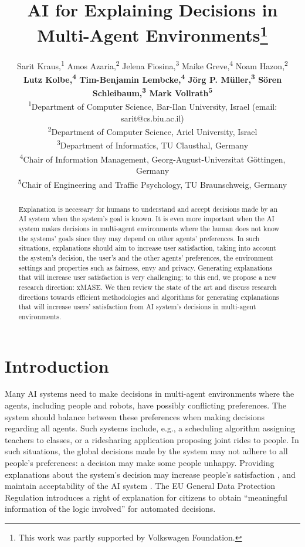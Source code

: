 \documentclass[letterpaper]{article} %
\title{AI for Explaining Decisions in Multi-Agent Environments\thanks{This work was partly supported by Volkswagen Foundation.}}
\author{Sarit Kraus,\textsuperscript{\rm 1} Amos Azaria,\textsuperscript{\rm 2} Jelena Fiosina,\textsuperscript{\rm 3} Maike Greve,\textsuperscript{\rm 4} Noam Hazon,\textsuperscript{\rm 2}\\
\Large{\textbf{Lutz Kolbe,\textsuperscript{\rm 4} Tim-Benjamin Lembcke,\textsuperscript{\rm 4} Jörg P. Müller,\textsuperscript{\rm 3} Sören Schleibaum,\textsuperscript{\rm 3} Mark Vollrath\textsuperscript{\rm 5}}} \\
\textsuperscript{1}{Department of Computer Science, Bar-Ilan University, Israel} (email: sarit@cs.biu.ac.il)\\
\textsuperscript{2}{Department of Computer Science, Ariel University, Israel} \\
\textsuperscript{3}{Department of Informatics, TU Clausthal, Germany} \\
\textsuperscript{4}{Chair of Information Management, Georg-August-Universitat Göttingen, Germany} \\
\textsuperscript{5}{Chair of Engineering and Traffic Psychology, TU Braunschweig, Germany}
}
\begin{document}
\maketitle

\begin{abstract}
Explanation is necessary for humans to understand and accept decisions made by an AI system when the system's goal is known. It is even more important when the AI system makes decisions in multi-agent environments where the human does not know the systems' goals since they may depend on other agents' preferences. In such situations, explanations should aim to increase user satisfaction, taking into account the system's decision, the user's and the other agents' preferences, the environment settings and properties such as fairness, envy and privacy.
Generating explanations that will increase user satisfaction is very challenging; to this end, we propose a new research direction: \ac{xMASE}.  We then review the state of the art and discuss research directions towards efficient methodologies and algorithms for generating explanations that will increase users' satisfaction from AI system's decisions in multi-agent environments.
\end{abstract}


\section{Introduction}

Many AI systems need to make decisions in multi-agent environments where the agents, including people and robots, have possibly conflicting preferences. The system should balance between these preferences when making decisions regarding all agents. Such systems include, e.g., a scheduling algorithm assigning teachers to classes, or a ridesharing application proposing joint rides to people. %
In such situations, the global decisions made by the system may not adhere to all people's preferences: a decision may make some people unhappy. Providing explanations about the system's decision may increase people's satisfaction \cite{bradley2009dealing}, and maintain acceptability of the AI system . The EU General Data Protection Regulation introduces a right of explanation \cite{Goodman2016} for citizens to obtain “meaningful information of the logic involved” for automated decisions.
\end{document}
